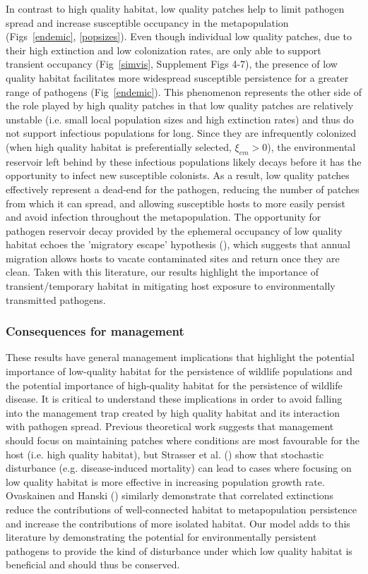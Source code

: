 \documentclass{article}
\begin{document}
In contrast to high quality habitat, low quality patches help to limit pathogen spread and increase susceptible occupancy in the metapopulation (Figs~\ref{endemic}, \ref{popsizes}). 
Even though individual low quality patches, due to their high extinction and low colonization rates, are only able to support transient occupancy (Fig~\ref{simvis}, Supplement Figs 4-7), the presence of low quality habitat facilitates more widespread susceptible persistence for a greater range of pathogens (Fig~\ref{endemic}).  
This phenomenon represents the other side of the role played by high quality patches in that low quality patches are relatively unstable (i.e. small local population sizes and high extinction rates) and thus do not support infectious populations for long.
Since they are infrequently colonized (when high quality habitat is preferentially selected, $\xi_{em} > 0$), the environmental reservoir left behind by these infectious populations likely decays before it has the opportunity to infect new susceptible colonists. 
As a result, low quality patches effectively represent a dead-end for the pathogen, reducing the number of patches from which it can spread, and allowing susceptible hosts to more easily persist and avoid infection throughout the metapopulation.
The opportunity for pathogen reservoir decay provided by the ephemeral occupancy of low quality habitat echoes the 'migratory escape' hypothesis (\cite{Loehle1995}), which suggests that annual migration allows hosts to vacate contaminated sites and return once they are clean.
Taken with this literature, our results highlight the importance of transient/temporary habitat in mitigating host exposure to environmentally transmitted pathogens.

\subsubsection*{Consequences for management}

These results have general management implications that highlight the potential importance of low-quality habitat for the persistence of wildlife populations and the potential importance of high-quality habitat for the persistence of wildlife disease.
It is critical to understand these implications in order to avoid falling into the management trap created by high quality habitat and its interaction with pathogen spread.
Previous theoretical work suggests that management should focus on maintaining patches where conditions are most favourable for the host (i.e. high quality habitat), but Strasser et al. (\cite{Strasser2010}) show that stochastic disturbance (e.g. disease-induced mortality) can lead to cases where focusing on low quality habitat is more effective in increasing population growth rate.
Ovaskainen and Hanski (\cite{Ovaskainen2003a}) similarly demonstrate that correlated extinctions reduce the contributions of well-connected habitat to metapopulation persistence and increase the contributions of more isolated habitat.
Our model adds to this literature by demonstrating the potential for environmentally persistent pathogens to provide the kind of disturbance under which low quality habitat is beneficial and should thus be conserved.
\end{document}
